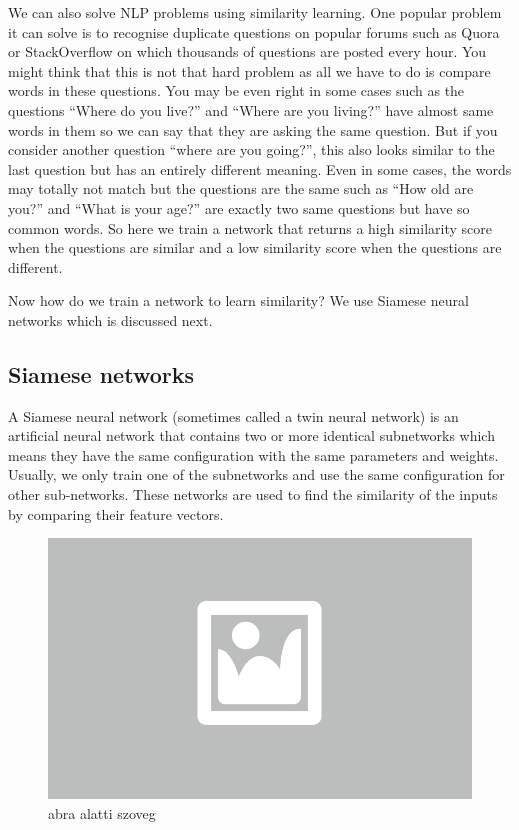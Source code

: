 We can also solve NLP problems using similarity learning. One popular problem it can solve is to recognise duplicate questions on popular forums such as Quora or StackOverflow on which thousands of questions are posted every hour. You might think that this is not that hard problem as all we have to do is compare words in these questions. You may be even right in some cases such as the questions “Where do you live?” and “Where are you living?” have almost same words in them so we can say that they are asking the same question. But if you consider another question “where are you going?”, this also looks similar to the last question but has an entirely different meaning. Even in some cases, the words may totally not match but the questions are the same such as “How old are you?” and “What is your age?” are exactly two same questions but have so common words. So here we train a network that returns a high similarity score when the questions are similar and a low similarity score when the questions are different.

Now how do we train a network to learn similarity? We use Siamese neural networks which is discussed next.

\subsection{Siamese networks}

A Siamese neural network (sometimes called a twin neural network) is an artificial neural network that contains two or more identical subnetworks which means they have the same configuration with the same parameters and weights. Usually, we only train one of the subnetworks and use the same configuration for other sub-networks. These networks are used to find the similarity of the inputs by comparing their feature vectors.

\begin{figure}[ht]
	\centering
	\includegraphics[width=0.65\columnwidth]{figures/abra.png}
	\caption{abra alatti szoveg}
\end{figure}

